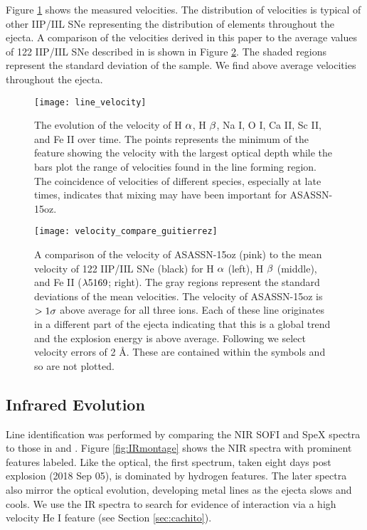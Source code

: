 \documentclass[a4paper,fleqn,usenatbib]{mnras}
\begin{document}
Figure \ref{fig:velocity} shows the measured velocities. 
The distribution of velocities is typical of other IIP/IIL SNe representing the distribution of elements throughout the ejecta. 
A comparison of the velocities derived in this paper to the average values of 122 IIP/IIL SNe described in \citet{2017gutierrez} is shown in Figure \ref{fig:VelocityCompare}. 
The shaded regions represent the standard deviation of the sample.
We find above average velocities throughout the ejecta.
\begin{figure}
\begin{center}
\texttt{[image: line\_velocity]}
\caption{The evolution of the velocity of H $\rm{\alpha}$, H $\rm{\beta}$, Na I, O I, Ca II, Sc II, and Fe II over time. 
The points represents the minimum of the feature showing the velocity with the largest optical depth while the bars plot the range of velocities found in the line forming region.
The coincidence of velocities of different species, especially at late times, indicates that mixing may have been important for ASASSN-15oz.}
\label{fig:velocity}
\end{center}
\end{figure}
\begin{figure*}
\begin{center}
\texttt{[image: velocity\_compare\_guitierrez]}
\caption{A comparison of the velocity of ASASSN-15oz (pink) to the mean velocity of 122 IIP/IIL SNe \citep{2017gutierrez} (black) for H $\rm{\alpha}$ (left), H $\rm{\beta}$ (middle), and Fe II ($\rm{\lambda 5169}$; right). 
The gray regions represent the standard deviations of the mean velocities.
The velocity of ASASSN-15oz is $\rm{>1\sigma}$ above average for all three ions. 
Each of these line originates in a different part of the ejecta indicating that this is a global trend and the explosion energy is above average. 
Following \citep{2012silverman} we select velocity errors of 2 \AA.
These are contained within the symbols and so are not plotted.}
\label{fig:VelocityCompare}
\end{center}
\end{figure*}
\subsection{Infrared Evolution}
Line identification was performed by comparing the NIR SOFI and SpeX spectra to those in \citet{2015valenti} and \citet{2018tomasella}.
Figure \ref{fig:IRmontage} shows the NIR spectra with prominent features labeled.
Like the optical, the first spectrum, taken eight days post explosion (2018 Sep 05), is dominated by hydrogen features.
The later spectra also mirror the optical evolution, developing metal lines as the ejecta slows and cools.
We use the IR spectra to search for evidence of interaction via a high velocity He I feature (see Section \ref{sec:cachito}).
\end{document}
